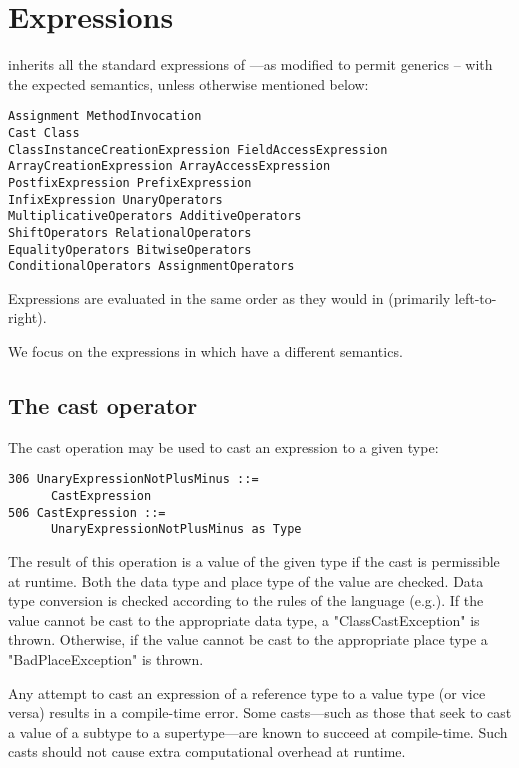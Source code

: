 \section{Expressions}\label{XtenExpressions}

{}\Xten{} inherits all the standard expressions of \Java{}
\cite[\S~15]{jls2}---as modified to permit generics \cite{gjspec} --
with the expected semantics, unless otherwise mentioned below:

\begin{verbatim}
Assignment MethodInvocation 
Cast Class
ClassInstanceCreationExpression FieldAccessExpression   
ArrayCreationExpression ArrayAccessExpression
PostfixExpression PrefixExpression 
InfixExpression UnaryOperators
MultiplicativeOperators AdditiveOperators 
ShiftOperators RelationalOperators  
EqualityOperators BitwiseOperators
ConditionalOperators AssignmentOperators
\end{verbatim}

Expressions are evaluated in the same order as they would in \java{}
(primarily
left-to-right).\label{FieldAccess}\label{ClassCreation}\label{MethodInvocation}

We focus on the expressions in \Xten{} which have a different
semantics.

\subsection{The cast operator}\label{ClassCast}
The cast operation may be used to cast an expression to a given type:
\begin{verbatim}
306 UnaryExpressionNotPlusMinus ::= 
      CastExpression
506 CastExpression ::= 
      UnaryExpressionNotPlusMinus as Type
\end{verbatim}

The result of this operation is a value of the given type if the cast
is permissible at runtime. Both the data type and place type of the
value are checked. Data type conversion is checked according to the
rules of the \java{} language (e.g.{}\cite[\S 5.5]{jls2}). If the
value cannot be cast to the appropriate data type, a
\xcd"ClassCastException"
is thrown. Otherwise, if the value cannot be cast to the
appropriate place type a \xcd"BadPlaceException" is thrown. 

Any attempt to cast an expression of a reference type to a value type
(or vice versa) results in a compile-time error. Some casts---such as
those that seek to cast a value of a subtype to a supertype---are
known to succeed at compile-time. Such casts should not cause extra
computational overhead at runtime.

